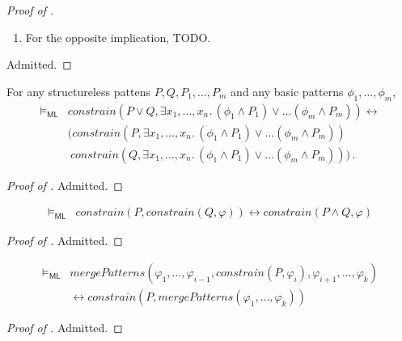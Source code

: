 \documentclass{article}
\newcommand{\ML}{\mathsf{ML}}
\begin{document}
\begin{proof}[Proof of ]
\begin{enumerate}
    TODO continue the proof
    \item For the opposite implication, TODO.
\end{enumerate}

Admitted.
\end{proof}



\begin{lemma}\label{lem:constrain}
  For any structureless pattens $P, Q, P_1, \ldots, P_m$
  and any basic patterns $\phi_1, \ldots, \phi_m$,
    \begin{align*}
        \vDash_\ML & \mathit{constrain}(P \lor Q, \exists x_1,\ldots,x_{n}.\, (\phi_1 \land P_1) \lor \ldots (\phi_m \land P_{m})) \leftrightarrow
        \\ & ( \mathit{constrain}(P, \exists x_1,\ldots,x_{n}.\, (\phi_1 \land P_1) \lor \ldots (\phi_m \land P_{m}))
        \\ & \ \mathit{constrain}(Q, \exists x_1,\ldots,x_{n}.\, (\phi_1 \land P_1) \lor \ldots (\phi_m \land P_{m})) ) \, .
    \end{align*}
\end{lemma}
\begin{proof}[Proof of ]
Admitted.
\end{proof}

\begin{lemma}\label{lem:doubleconstrain}
    \begin{align*}
        \vDash_\ML & \mathit{constrain}(P , \mathit{constrain}(Q, \varphi))
        \leftrightarrow \mathit{constrain}(P \land Q, \varphi)
    \end{align*}
\end{lemma}
\begin{proof}[Proof of ]
Admitted.
\end{proof}

\begin{lemma}\label{lem:constrainMergeComm}
    \begin{align*}
        \vDash_\ML & \mathit{mergePatterns}(\varphi_1, \ldots, \varphi_{i-1}, \mathit{constrain}(P, \varphi_i), \varphi_{i+1}, \ldots, \varphi_k) \\
        & \leftrightarrow \mathit{constrain}(P, \mathit{mergePatterns(\varphi_1, \ldots, \varphi_k)})
    \end{align*}
\end{lemma}
\begin{proof}[Proof of ]
Admitted.
\end{proof}
\end{document}
